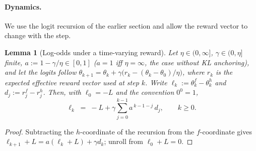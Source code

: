 \documentclass[11pt,a4paper]{article}
\newtheorem{lemma}[theorem]{Lemma}
\begin{document}
\paragraph{Dynamics.} We use the logit recursion of the earlier section and
allow the reward vector to change with the step.

\begin{lemma}[Log-odds under a time-varying reward]\label{lem:audit-logodds}
Let $\eta\in(0,\infty]$, $\gamma\in(0,\eta]$ finite, $a:=1-\gamma/\eta\in[0,1]$
($a=1$ iff $\eta=\infty$, the case without KL anchoring), and let the logits
follow $\theta_{k+1}=\theta_k+\gamma\bigl(r_k-(\theta_k-\theta_0)/\eta\bigr)$,
where $r_k$ is the expected effective reward vector used at step $k$. Write
$\ell_k:=\theta_k^{f}-\theta_k^{h}$ and $d_j:=r_j^{f}-r_j^{h}$. Then, with
$\ell_0=-L$ and the convention $0^0=1$,
\begin{equation}\label{eq:audit-logodds}
  \ell_k \;=\; -L+\gamma\sum_{j=0}^{k-1}a^{\,k-1-j}\,d_j ,\qquad k\ge 0 .
\end{equation}
\end{lemma}
\begin{proof}
Subtracting the $h$-coordinate of the recursion from the $f$-coordinate gives
$\ell_{k+1}+L=a(\ell_k+L)+\gamma d_k$; unroll from $\ell_0+L=0$.
\end{proof}
\end{document}
